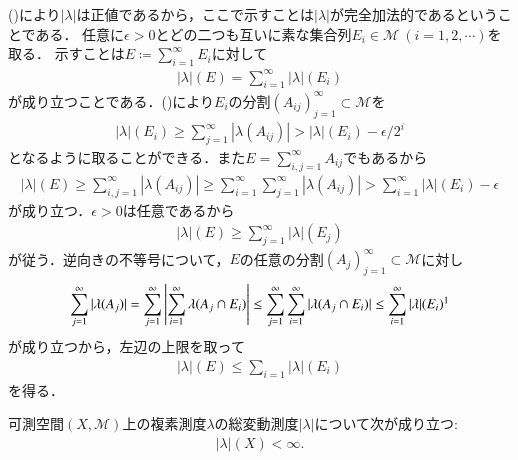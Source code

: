 	\begin{prf}
		()により$|\lambda|$は正値であるから，ここで示すことは$|\lambda|$が完全加法的であるということである．
		任意に$\epsilon > 0$とどの二つも互いに素な集合列$E_i \in \mathcal{M}\ (i=1,2,\cdots)$を取る．
		示すことは$E \coloneqq \sum_{i=1}^{\infty} E_i$に対して
		\begin{align}
			|\lambda|(E) = \sum_{i=1}^{\infty} |\lambda|(E_i)
		\end{align}
		が成り立つことである．()により$E_i$の分割$(A_{ij})_{j=1}^{\infty} \subset \mathcal{M}$を
		\begin{align}
			|\lambda|(E_i) \geq \sum_{j=1}^{\infty} |\lambda(A_{ij})| > |\lambda|(E_i) - \epsilon/2^i
		\end{align}
		となるように取ることができる．また$E = \sum_{i,j=1}^{\infty} A_{ij}$でもあるから
		\begin{align}
			|\lambda|(E) \geq \sum_{i,j=1}^{\infty} |\lambda(A_{ij})| \geq \sum_{i=1}^{\infty}\sum_{j=1}^{\infty} |\lambda(A_{ij})| > \sum_{i=1}^{\infty} |\lambda|(E_i) - \epsilon
		\end{align}
		が成り立つ．$\epsilon > 0$は任意であるから
		\begin{align}
			|\lambda|(E) \geq \sum_{j=1}^{\infty} |\lambda|(E_j)
		\end{align}
		が従う．逆向きの不等号について，$E$の任意の分割$(A_j)_{j=1}^{\infty} \subset \mathcal{M}$に対し
		\begin{align}
			\sum_{j=1}^{\infty} |\lambda(A_j)| 
			= \sum_{j=1}^{\infty} \left| \sum_{i=1}^{\infty} \lambda(A_j \cap E_i) \right|
			\leq \sum_{j=1}^{\infty} \sum_{i=1}^{\infty} |\lambda(A_j \cap E_i)|
			\leq \sum_{i=1}^{\infty} |\lambda|(E_i)
			\footnotemark
		\end{align}
		が成り立つから，左辺の上限を取って
		\begin{align}
			|\lambda|(E) \leq \sum_{i=1} |\lambda|(E_i)
		\end{align}
		を得る．
		\QED
	\end{prf}
	
	\begin{itembox}[l]{}	
		\begin{thm}[総変動測度は有界]
			可測空間$(X,\mathcal{M})$上の複素測度$\lambda$の総変動測度$|\lambda|$について次が成り立つ:
			\begin{align}
				|\lambda|(X) < \infty.
			\end{align}
			\label{thm:total_variation_measure_bounded}
		\end{thm}
	\end{itembox}
	
